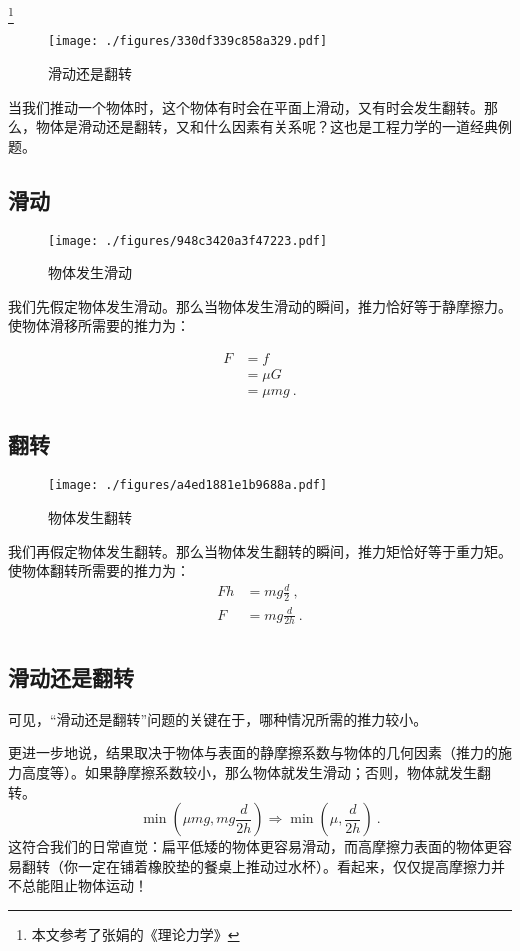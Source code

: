 
\begin{issues}
\issueMissDepend
\end{issues}

\footnote{本文参考了张娟的《理论力学》}

\begin{figure}[ht]
\centering
\texttt{[image: ./figures/330df339c858a329.pdf]}
\caption{滑动还是翻转} \label{fig_SDOTN_1}
\end{figure}

当我们推动一个物体时，这个物体有时会在平面上滑动，又有时会发生翻转。那么，物体是滑动还是翻转，又和什么因素有关系呢？这也是工程力学的一道经典例题。

\subsection{滑动}
\begin{figure}[ht]
\centering
\texttt{[image: ./figures/948c3420a3f47223.pdf]}
\caption{物体发生滑动} \label{fig_SDOTN_2}
\end{figure}
我们先假定物体发生滑动。那么当物体发生滑动的瞬间，推力恰好等于静摩擦力。使物体滑移所需要的推力为：

\begin{equation}
\begin{aligned}
F&=f\\
&=\mu G\\
&=\mu mg~.
\end{aligned}
\end{equation}

\subsection{翻转}
\begin{figure}[ht]
\centering
\texttt{[image: ./figures/a4ed1881e1b9688a.pdf]}
\caption{物体发生翻转} \label{fig_SDOTN_3}
\end{figure}
我们再假定物体发生翻转。那么当物体发生翻转的瞬间，推力矩恰好等于重力矩。使物体翻转所需要的推力为：
\begin{equation}
\begin{aligned}
Fh&=mg \frac{d}{2}~,\\
F&=mg \frac{d}{2h}~.\\
\end{aligned}
\end{equation}

\subsection{滑动还是翻转}
可见，“滑动还是翻转”问题的关键在于，哪种情况所需的推力较小。

更进一步地说，结果取决于物体与表面的静摩擦系数与物体的几何因素（推力的施力高度等）。如果静摩擦系数较小，那么物体就发生滑动；否则，物体就发生翻转。
\begin{equation}
\min(\mu mg, mg \frac{d}{2h})\Rightarrow
\min(\mu, \frac{d}{2h})~.
\end{equation}
这符合我们的日常直觉：扁平低矮的物体更容易滑动，而高摩擦力表面的物体更容易翻转（你一定在铺着橡胶垫的餐桌上推动过水杯）。看起来，仅仅提高摩擦力并不总能阻止物体运动！
